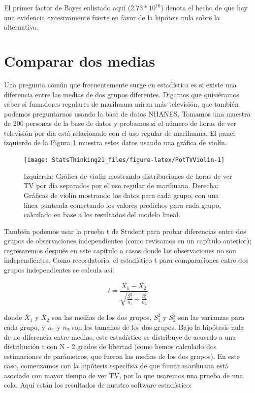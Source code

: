 \documentclass[
  12pt,
]{book}
\begin{document}
El primer factor de Bayes enlistado aquí (\(2.73 * 10^{16}\)) denota el hecho de que hay una evidencia excesivamente fuerte en favor de la hipóteis nula sobre la alternativa.

\hypertarget{comparing-two-means}{%
\section{Comparar dos medias}\label{comparing-two-means}}

Una pregunta común que frecuentemente surge en estadística es si existe una diferencia entre las medias de dos grupos diferentes. Digamos que quisiéramos saber si fumadores regulares de marihuana miran más televisión, que también podemos preguntarnos usando la base de datos NHANES. Tomamos una muestra de 200 personas de la base de datos y probamos si el número de horas de ver televisión por día está relacionado con el uso regular de marihuana. El panel izquierdo de la Figura \ref{fig:PotTVViolin} muestra estos datos usando una gráfica de violín.

\begin{figure}
\texttt{[image: StatsThinking21\_files/figure-latex/PotTVViolin-1]} \caption{Izquierda: Gráfica de violín mostrando distribuciones de horas de ver TV por día separados por el uso regular de marihuana. Derecha: Gráficas de violín mostrando los datos para cada grupo, con una línea punteada conectando los valores predichos para cada grupo, calculado en base a los resultados del modelo lineal.}\label{fig:PotTVViolin}
\end{figure}

También podemos usar la prueba t de Student para probar diferencias entre dos grupos de observaciones independientes (como revisamos en un capítulo anterior); regresaremos después en este capítulo a casos donde las observaciones no son independientes. Como recordatorio, el estadístico t para comparaciones entre dos grupos independientes se calcula así:

\[
t = \frac{\bar{X_1} - \bar{X_2}}{\sqrt{\frac{S_1^2}{n_1} + \frac{S_2^2}{n_2}}}
\]

donde \(\bar{X}_1\) y \(\bar{X}_2\) son las medias de los dos grupos, \(S^2_1\) y \(S^2_2\) son las varianzas para cada grupo, y \(n_1\) y \(n_2\) son los tamaños de los dos grupos. Bajo la hipótesis nula de no diferencia entre medias, este estadístico se distribuye de acuerdo a una distribución t con N - 2 grados de libertad (como hemos calculado dos estimaciones de parámetros, que fueron las medias de los dos grupos). En este caso, comenzamos con la hipótesis específica de que fumar marihuana está asociado con mayor tiempo de ver TV, por lo que usaremos una prueba de una cola. Aquí están los resultados de nuestro software estadístico:
\end{document}
